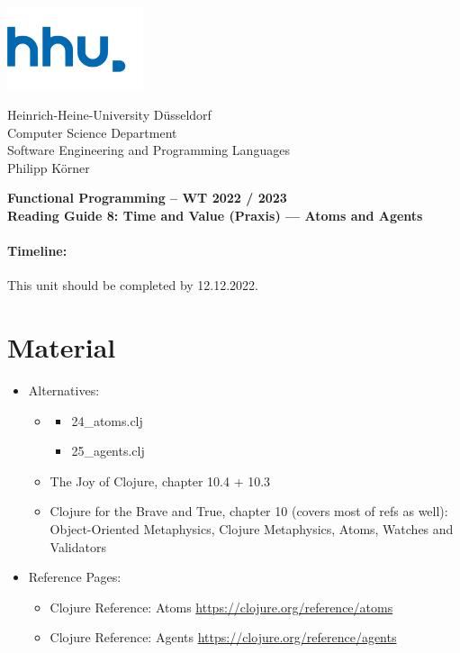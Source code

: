 \documentclass[11pt,a4paper]{article}
\begin{document}
\begin{minipage}[b]{\textwidth}
	\parbox[t]{5cm}{%
		\includegraphics[width=4cm]{unilogo}
		\hfill
	}
	\parbox[b]{11cm}{%
		Heinrich-Heine-University D\"usseldorf\\
		Computer Science Department\\
		Software Engineering and Programming Languages\\
		Philipp K\"orner
	}
\end{minipage}
\begin{center}
	\bf
	Functional Programming -- WT 2022 / 2023\\
	Reading Guide 8: Time and Value (Praxis) --- Atoms and Agents
\end{center}

\pagestyle{empty}

\paragraph{Timeline:} This unit should be completed by 12.12.2022.

\section{Material} 

\begin{itemize}
    \item Alternatives:
        \begin{itemize}
            \item \begin{itemize}
                \item 24\_atoms.clj
                \item 25\_agents.clj
            \end{itemize}
            \item The Joy of Clojure, chapter 10.4 + 10.3
            \item Clojure for the Brave and True, chapter 10 (covers most of refs as well): Object-Oriented Metaphysics, Clojure Metaphysics, Atoms, Watches and Validators
        \end{itemize}
    \item Reference Pages:
        \begin{itemize}
    \item Clojure Reference: Atoms \url{https://clojure.org/reference/atoms}
    \item Clojure Reference: Agents \url{https://clojure.org/reference/agents}
        \end{itemize}
\end{itemize}
\end{document}
